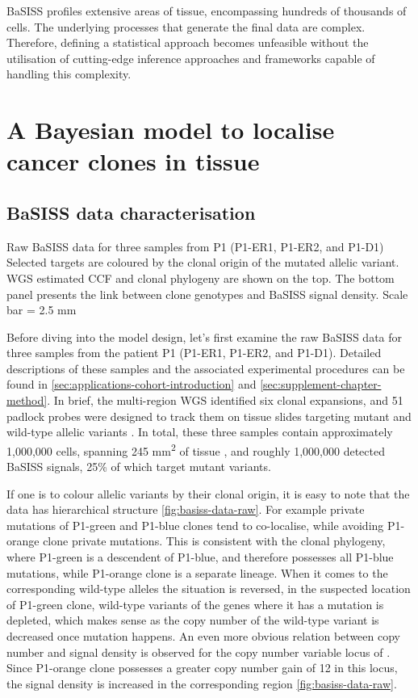 \ac{BaSISS} profiles extensive areas of tissue, encompassing hundreds of thousands of cells. The underlying processes that generate the final data are complex. Therefore, defining a statistical approach becomes unfeasible without the utilisation of cutting-edge inference approaches and frameworks capable of handling this complexity.

\section{A Bayesian model to localise cancer clones in tissue}
\subsection{\acs{BaSISS} data characterisation}
\label{sec:bassis-data-brief}

    {Raw \acs{BaSISS} data for three samples from P1 (P1-ER1, P1-ER2, and P1-D1)}
    {Selected targets are coloured by the clonal origin of the mutated allelic variant. \ac{WGS} estimated \acl{CCF} and clonal phylogeny are shown on the top. The bottom panel presents the link between clone genotypes and \ac{BaSISS} signal density. Scale bar = 2.5 mm}

Before diving into the model design, let's first examine the raw \ac{BaSISS} data for three samples from the patient P1 (P1-ER1, P1-ER2, and P1-D1). Detailed descriptions of these samples and the associated experimental procedures can be found in \cref{sec:applications-cohort-introduction} and \cref{sec:supplement-chapter-method}.  In brief, the multi-region \ac{WGS} identified six clonal expansions, and 51 padlock probes were designed to track them on tissue slides targeting mutant and wild-type allelic variants . In total, these three samples contain approximately 1,000,000 cells, spanning 245 mm\textsuperscript{2} of tissue , and roughly 1,000,000 detected \ac{BaSISS} signals, 25\% of which target mutant variants.

If one is to colour allelic variants by their clonal origin, it is easy to note that the data has hierarchical structure \cref{fig:basiss-data-raw}. For example private mutations of P1-green and P1-blue clones tend to co-localise, while avoiding P1-orange clone private mutations. This is consistent with the clonal phylogeny, where P1-green is a descendent of P1-blue, and therefore possesses all P1-blue mutations, while P1-orange clone is a separate lineage. When it comes to the corresponding wild-type alleles the situation is reversed, in the suspected location of P1-green clone, wild-type variants of the genes where it has a mutation is depleted, which makes sense as the copy number of the wild-type variant is decreased once mutation happens. An even more obvious relation between copy number and signal density is observed for the copy number variable locus of . Since P1-orange clone possesses a greater copy number gain of 12 in this locus, the signal density is increased in the corresponding region \cref{fig:basiss-data-raw}. 

